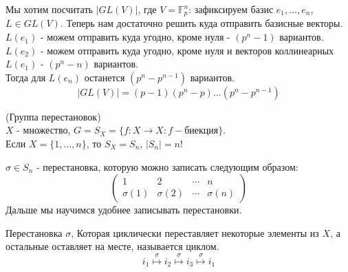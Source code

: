 \begin{example}
	Мы хотим посчитать $|GL(V)|$, где $V = \mathbb{F}_p^n$: зафиксируем базис $e_1, \dots, e_n$, $L \in GL(V)$. Теперь нам достаточно решить куда отправить базисные векторы. \\
	$L(e_1)$ - можем отправить куда угодно, кроме нуля - $\left(p^n - 1\right)$ вариантов. \\
	$L(e_2)$ - можем отправить куда угодно, кроме нуля и векторов коллинеарных $L(e_1)$ - $\left(p^n - n\right)$ вариантов. \\
	Тогда для $L(e_n)$ останется $\left(p^n - p^{n-1}\right)$ вариантов.
	$$|GL(V)| = \left(p - 1\right)\left(p^n - p\right)\dots\left(p^n - p^{n-1}\right)$$
\end{example}

\begin{definition}
	(Группа перестановок) \\ $X$ - множество, $G = S_X = \{f: X \to X: f - \text{биекция}\}$.\\ Если $X = \{1, \dots, n\}$, то $S_X = S_n$, $|S_n| = n!$
\end{definition}

\begin{definition}
	$\sigma \in S_n$ - перестановка, которую можно записать следующим образом:
	\[
		\begin{pmatrix}
			1 & 2 & \cdots & n \\
			\sigma(1) & \sigma(2) & \cdots & \sigma(n)
		\end{pmatrix}
	\]
	Дальше мы научимся удобнее записывать перестановки.
\end{definition}

\begin{definition}
	Перестановка $\sigma$, Которая циклически переставляет некоторые элементы из $X$, а остальные оставляет на месте, называется циклом.
	\[
	i_1 \overset{\sigma}{\mapsto} i_2 \overset{\sigma}{\mapsto} i_3 \overset{\sigma}{\mapsto} i_1
	\]
\end{definition}

